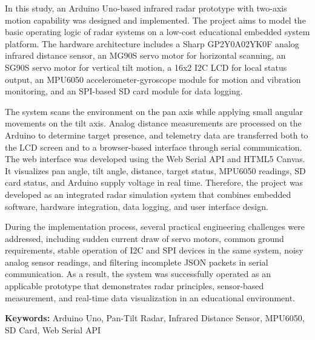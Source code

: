 In this study, an Arduino Uno-based infrared radar prototype with two-axis motion capability was designed and implemented. The project aims to model the basic operating logic of radar systems on a low-cost educational embedded system platform. The hardware architecture includes a Sharp GP2Y0A02YK0F analog infrared distance sensor, an MG90S servo motor for horizontal scanning, an SG90S servo motor for vertical tilt motion, a 16x2 I2C LCD for local status output, an MPU6050 accelerometer-gyroscope module for motion and vibration monitoring, and an SPI-based SD card module for data logging.

The system scans the environment on the pan axis while applying small angular movements on the tilt axis. Analog distance measurements are processed on the Arduino to determine target presence, and telemetry data are transferred both to the LCD screen and to a browser-based interface through serial communication. The web interface was developed using the Web Serial API and HTML5 Canvas. It visualizes pan angle, tilt angle, distance, target status, MPU6050 readings, SD card status, and Arduino supply voltage in real time. Therefore, the project was developed as an integrated radar simulation system that combines embedded software, hardware integration, data logging, and user interface design.

During the implementation process, several practical engineering challenges were addressed, including sudden current draw of servo motors, common ground requirements, stable operation of I2C and SPI devices in the same system, noisy analog sensor readings, and filtering incomplete JSON packets in serial communication. As a result, the system was successfully operated as an applicable prototype that demonstrates radar principles, sensor-based measurement, and real-time data visualization in an educational environment.

\vspace{1cm}
\textbf{Keywords:} Arduino Uno, Pan-Tilt Radar, Infrared Distance Sensor, MPU6050, SD Card, Web Serial API
